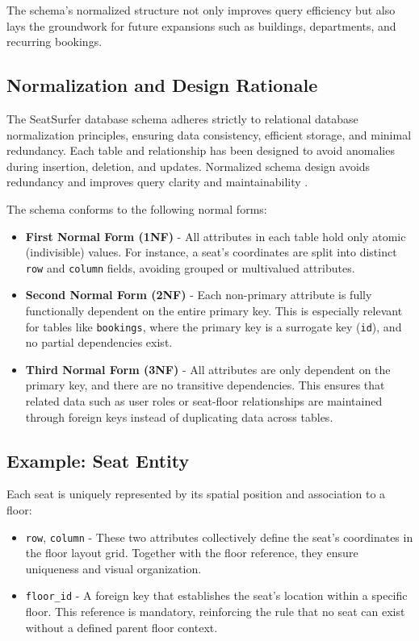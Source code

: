 \documentclass[12pt,a4paper]{report} %
\begin{document}
The schema's normalized structure not only improves query efficiency but also lays the groundwork for future expansions such as buildings, departments, and recurring bookings.

\subsection{Normalization and Design Rationale}

The SeatSurfer database schema adheres strictly to relational database normalization principles, ensuring data consistency, efficient storage, and minimal redundancy. Each table and relationship has been designed to avoid anomalies during insertion, deletion, and updates. Normalized schema design avoids redundancy and improves query clarity and maintainability \cite{davis2021datamodeling}.

The schema conforms to the following normal forms:

\begin{itemize}
    \item \textbf{First Normal Form (1NF)} - All attributes in each table hold only atomic (indivisible) values. For instance, a seat's coordinates are split into distinct \texttt{row} and \texttt{column} fields, avoiding grouped or multivalued attributes.
    
    \item \textbf{Second Normal Form (2NF)} - Each non-primary attribute is fully functionally dependent on the entire primary key. This is especially relevant for tables like \texttt{bookings}, where the primary key is a surrogate key (\texttt{id}), and no partial dependencies exist.

    \item \textbf{Third Normal Form (3NF)} - All attributes are only dependent on the primary key, and there are no transitive dependencies. This ensures that related data such as user roles or seat-floor relationships are maintained through foreign keys instead of duplicating data across tables.
\end{itemize}

\subsection*{Example: Seat Entity}

Each seat is uniquely represented by its spatial position and association to a floor:

\begin{itemize}
    \item \texttt{row}, \texttt{column} - These two attributes collectively define the seat's coordinates in the floor layout grid. Together with the floor reference, they ensure uniqueness and visual organization.
    
    \item \texttt{floor\_id} - A foreign key that establishes the seat's location within a specific floor. This reference is mandatory, reinforcing the rule that no seat can exist without a defined parent floor context.
\end{itemize}
\end{document}
